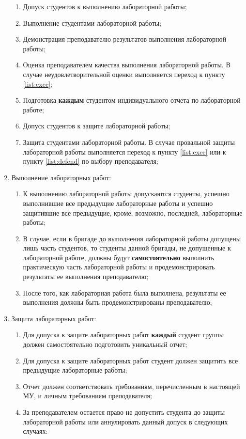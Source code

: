 \begin{enumerate}
\begin{enumerate}
		\item Допуск студентов к выполнению лабораторной работы;
		\item Выполнение студентами лабораторной работы;\label{list:exec}
		\item Демонстрация преподавателю результатов выполнения лабораторной работы;
		\item Оценка преподавателем качества выполнения лабораторной работы. В случае неудовлетворительной оценки выполняется переход к пункту \ref{list:exec};
		\item Подготовка {\bf каждым} студентом индивидуального отчета по лабораторной работе;\label{list:defend}
		\item Допуск студентов к защите лабораторной работы;
		\item Защита студентами лабораторной работы. В случае провальной защиты лабораторной работы выполняется переход к пункту \ref{list:exec} или к пункту \ref{list:defend} по выбору преподавателя;

	\end{enumerate}

	\item Выполнение лабораторных работ:

	\begin{enumerate}

		\item К выполнению лабораторной работы допускаются студенты, успешно выполнившие все предыдущие лабораторные работы и успешно защитившие все предыдущие, кроме, возможно, последней, лабораторные работы;
		\item В случае, если в бригаде до выполнения лабораторной работы допущены лишь часть студентов, то студенты данной бригады, не допущенные к лабораторной работе, должны будут {\bf самостоятельно} выполнить практическую часть лабораторной работы и продемонстрировать результаты ее выполнения преподавателю;
		\item После того, как лабораторная работа была выполнена, результаты ее выполнения должны быть продемонстрированы преподавателю;

	\end{enumerate}

	\item Защита лабораторных работ:

	\begin{enumerate}

		\item Для допуска к защите лабораторных работ {\bf каждый} студент группы должен самостоятельно подготовить уникальный отчет;
		\item Для допуска к защите лабораторных работ студент должен защитить все предыдущие лабораторные работы;
		\item Отчет должен соответствовать требованиям, перечисленным в настоящей МУ, и личным требованиям преподавателя;
		\item За преподавателем остается право не допустить студента до защиты лабораторной работы или аннулировать данный допуск в следующих случаях:


\end{enumerate}
\end{enumerate}
